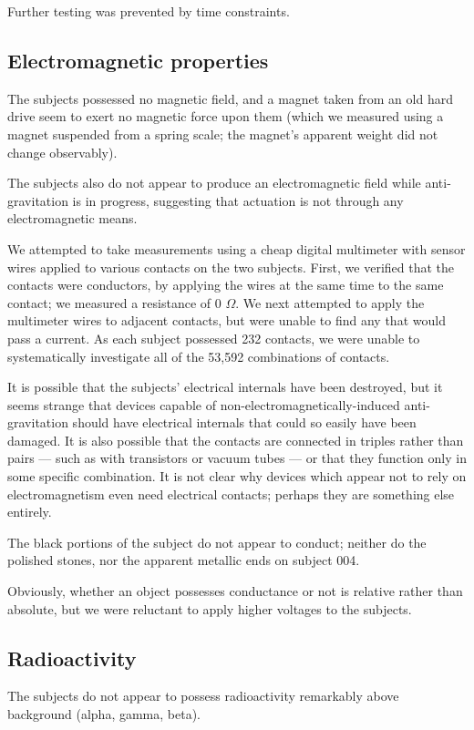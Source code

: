 \documentclass[10pt]{article}
\begin{document}

Further testing was prevented by time constraints.

\subsection{Electromagnetic properties}

The subjects possessed no magnetic field, and a magnet taken from an old hard drive seem to exert no magnetic force upon them (which we measured using a magnet suspended from a spring scale; the magnet's apparent weight did not change observably).

The subjects also do not appear to produce an electromagnetic field while anti-gravitation is in progress, suggesting that actuation is not through any electromagnetic means.

We attempted to take measurements using a cheap digital multimeter with sensor wires applied to various contacts on the two subjects.
First, we verified that the contacts were conductors, by applying the wires at the same time to the same contact; we measured a resistance of 0 $\Omega$.
We next attempted to apply the multimeter wires to adjacent contacts, but were unable to find any that would pass a current.
As each subject possessed 232 contacts, we were unable to systematically investigate all of the 53,592 combinations of contacts.

It is possible that the subjects' electrical internals have been destroyed, but it seems strange that devices capable of non-electromagnetically-induced anti-gravitation should have electrical internals that could so easily have been damaged.
It is also possible that the contacts are connected in triples rather than pairs --- such as with transistors or vacuum tubes --- or that they function only in some specific combination.
It is not clear why devices which appear not to rely on electromagnetism even need electrical contacts; perhaps they are something else entirely.

The black portions of the subject do not appear to conduct; neither do the polished stones, nor the apparent metallic ends on subject 004.

Obviously, whether an object possesses conductance or not is relative rather than absolute, but we were reluctant to apply higher voltages to the subjects.

\subsection{Radioactivity}
The subjects do not appear to possess radioactivity remarkably above background (alpha, gamma, beta).
\end{document}
